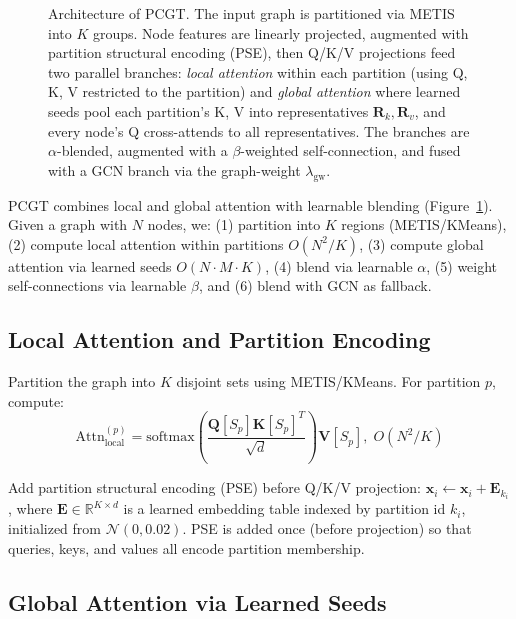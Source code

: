 \begin{figure}[t]
{\begin{tikzpicture}
\end{tikzpicture}
}%
\caption{Architecture of PCGT\@. The input graph is partitioned via METIS into $K$ groups. Node features are linearly projected, augmented with partition structural encoding (PSE), then Q/K/V projections feed two parallel branches: \emph{local attention} within each partition (using Q, K, V restricted to the partition) and \emph{global attention} where learned seeds pool each partition's K, V into representatives $\mathbf{R}_k, \mathbf{R}_v$, and every node's Q cross-attends to all representatives. The branches are $\alpha$-blended, augmented with a $\beta$-weighted self-connection, and fused with a GCN branch via the graph-weight $\lambda_{\text{gw}}$.}
\label{fig:architecture}
\end{figure}

PCGT combines local and global attention with learnable blending (Figure~\ref{fig:architecture}). Given a graph with $N$ nodes, we: (1) partition into $K$ regions (METIS/KMeans), (2) compute local attention within partitions $O(N^2/K)$, (3) compute global attention via learned seeds $O(N{\cdot}M{\cdot}K)$, (4) blend via learnable $\alpha$, (5) weight self-connections via learnable $\beta$, and (6) blend with GCN as fallback.

\subsection{Local Attention and Partition Encoding}

Partition the graph into $K$ disjoint sets using METIS/KMeans. For partition $p$, compute:
\begin{equation}
\text{Attn}_{\text{local}}^{(p)} = \text{softmax}\!\left( \frac{\mathbf{Q}[S_p] \mathbf{K}[S_p]^T}{\sqrt{d}} \right) \mathbf{V}[S_p],\; O(N^2\!/K)
\end{equation}

Add partition structural encoding (PSE) before Q/K/V projection: $\mathbf{x}_i \leftarrow \mathbf{x}_i + \mathbf{E}_{k_i}$, where $\mathbf{E} \in \mathbb{R}^{K \times d}$ is a learned embedding table indexed by partition id $k_i$, initialized from $\mathcal{N}(0, 0.02)$.  PSE is added once (before projection) so that queries, keys, and values all encode partition membership.

\subsection{Global Attention via Learned Seeds}
\label{sec:global_attn}

